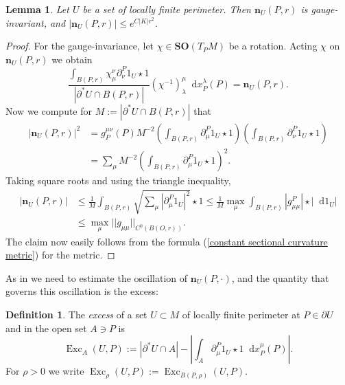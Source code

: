 \documentclass[reqno,10pt]{amsart}
\newcommand{\SpOrth}{\mathbf{SO}}
\DeclareMathOperator{\Exc}{Exc}
\newcommand*\dif{\mathop{}\!\mathrm{d}}
\newcommand{\normal}{\mathbf n}
\newcommand{\dfn}[1]{\emph{#1}\index{#1}}
\newtheorem{lemma}[theorem]{Lemma}
\theoremstyle{definition}
\newtheorem{definition}[theorem]{Definition}
\numberwithin{equation}{section}
\begin{document}
\begin{lemma}
Let $U$ be a set of locally finite perimeter. Then $\normal_U(P, r)$ is gauge-invariant, and $|\normal_U(P, r)| \leq e^{C|K|r^2}$.
\end{lemma}
\begin{proof}
For the gauge-invariance, let $\chi \in \SpOrth(T_PM)$ be a rotation.
Acting $\chi$ on $\normal_U(P, r)$ we obtain
$$\frac{\int_{B(P, r)} \chi^\nu_\mu \partial^P_\nu 1_U \star 1}{|\partial^* U \cap B(P, r)|} (\chi^{-1})_\lambda^\mu \dif x^\lambda_P(P) = \normal_U(P, r).$$ 
Now we compute for $M := |\partial^* U \cap B(P, r)|$ that 
\begin{align*}
|\normal_U(P, r)|^2 &= g^{\mu\nu}_P(P) M^{-2} \left(\int_{B(P, r)} \partial^P_\mu 1_U \star 1\right) \left(\int_{B(P, r)} \partial^P_\nu 1_U \star 1\right) \\
&= \sum_\mu M^{-2} \left(\int_{B(P, r)} \partial^P_\mu 1_U \star 1\right)^2.
\end{align*}
Taking square roots and using the triangle inequality,
\begin{align*}
|\normal_U(P, r)| &\leq \frac{1}{M} \int_{B(P, r)} \sqrt{\sum_\mu |\partial^P_\mu 1_U|^2} \star 1 \leq \frac{1}{M} \max_\mu \int_{B(P, r)} |g^P_{\mu\mu}| \star |\dif 1_U| \\
&\leq \max_\mu ||g_{\mu\mu}||_{C^0(B(O, r))}.
\end{align*}
The claim now easily follows from the formula (\ref{constant sectional curvature metric}) for the metric.
\end{proof}

As in \cite[Chapters 8-9]{Giusti77} we need to estimate the oscillation of $\normal_U(P, \cdot)$, and the quantity that governs this oscillation is the excess:

\begin{definition}
The \dfn{excess} of a set $U \subset M$ of locally finite perimeter at $P \in \partial U$ and in the open set $A \ni P$ is 
$$\Exc_A(U, P) := |\partial^* U \cap A| - \left|\int_A \partial^P_\mu 1_U \star 1 \dif x_P^\mu(P)\right|.$$
For $\rho > 0$ we write $\Exc_\rho(U, P) := \Exc_{B(P, \rho)}(U, P)$.
\end{definition}
\end{document}
